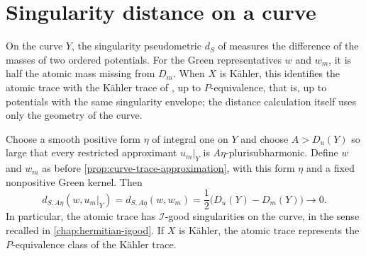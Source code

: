 \section{Singularity distance on a curve}

On the curve $Y$, the singularity pseudometric $d_S$ of \cite[Definition~6.2.1]{SGPT} measures the difference of the masses of two ordered potentials. For the Green representatives $w$ and $w_m$, it is half the atomic mass missing from $D_m$. When $X$ is K\"ahler, this identifies the atomic trace with the K\"ahler trace of \cite[Section~8.1]{SGPT}, up to $P$-equivalence, that is, up to potentials with the same singularity envelope; the distance calculation itself uses only the geometry of the curve.

\begin{proposition}\label{prop:curve-trace-source-distance}
Choose a smooth positive form $\eta$ of integral one on $Y$ and choose $A>D_u(Y)$ so large that every restricted approximant $u_m|_Y$ is $A\eta$-plurisubharmonic. Define $w$ and $w_m$ as before \cref{prop:curve-trace-approximation}, with this form $\eta$ and a fixed nonpositive Green kernel. Then
\begin{equation}\label{eq:curve-trace-source-distance}
 d_{S,A\eta}(w,u_m|_Y)
 =d_{S,A\eta}(w,w_m)
 =\frac12\bigl(D_u(Y)-D_m(Y)\bigr)
 \longrightarrow0.
\end{equation}
In particular, the atomic trace has $\mathcal I$-good singularities on the curve, in the sense recalled in \cref{chap:hermitian-igood}. If $X$ is K\"ahler, the atomic trace represents the $P$-equivalence class of the K\"ahler trace.
\end{proposition}
